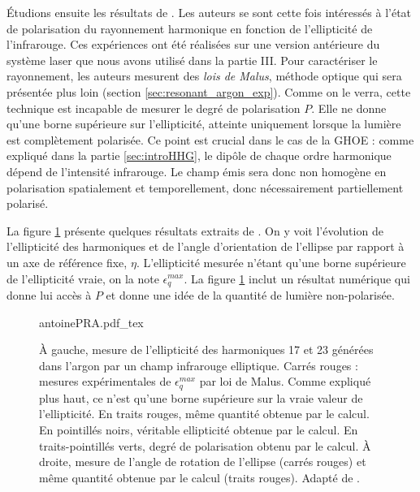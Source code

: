 \'{E}tudions ensuite les résultats de . Les auteurs se sont cette fois intéressés à l'état de polarisation du rayonnement harmonique en fonction de l'ellipticité de l'infrarouge. Ces expériences ont été réalisées sur une version antérieure du système laser que nous avons utilisé dans la partie III. Pour caractériser le rayonnement, les auteurs mesurent des \textit{lois de Malus}, méthode optique qui sera présentée plus loin (section \ref{sec:resonant_argon_exp}). Comme on le verra, cette technique est incapable de mesurer le degré de polarisation $P$. Elle ne donne qu'une borne supérieure sur l'ellipticité, atteinte uniquement lorsque la lumière est complètement polarisée. Ce point est crucial dans le cas de la GHOE : comme expliqué dans la partie \ref{sec:introHHG}, le dipôle de chaque ordre harmonique dépend de l'intensité infrarouge. Le champ émis sera donc non homogène en polarisation spatialement et temporellement, donc nécessairement partiellement polarisé.

La figure \ref{fig:antoinepra} présente quelques résultats extraits de . On y voit l'évolution de l'ellipticité des harmoniques et de l'angle d'orientation de l'ellipse par rapport à un axe de référence fixe, $\eta$. L'ellipticité mesurée n'étant qu'une borne supérieure de l'ellipticité vraie, on la note $\epsilon^{max}_q$. La figure \ref{fig:antoinepra} inclut un résultat numérique qui donne lui accès à $P$ et donne une idée de la quantité de lumière non-polarisée.

\begin{figure}[!ht]
\centering
\def\svgwidth{\columnwidth}
{antoinePRA.pdf_tex}
\caption{\`{A} gauche, mesure de l'ellipticité des harmoniques 17 et 23 générées dans l'argon par un champ infrarouge elliptique. Carrés rouges : mesures expérimentales de $\epsilon^{max}_q$ par loi de Malus. Comme expliqué plus haut, ce n'est qu'une borne supérieure sur la vraie valeur de l'ellipticité. En traits rouges, même quantité obtenue par le calcul. En pointillés noirs, véritable ellipticité obtenue par le calcul. En traits-pointillés verts, degré de polarisation obtenu par le calcul. \`{A} droite, mesure de l'angle de rotation de l'ellipse (carrés rouges) et même quantité obtenue par le calcul (traits rouges). Adapté de .}
\label{fig:antoinepra}
\end{figure}

